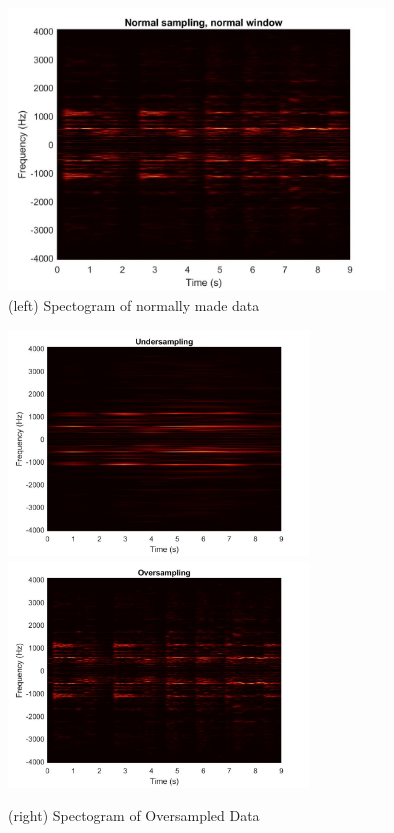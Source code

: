 \documentclass{article}
\begin{document}
\begin{figure}[H]
\begin{center}
\includegraphics[width = 10cm]{normal}
\caption{\label{fig:scaled_diss} (left) Spectogram of normally made data}
\end{center}
\end{figure}


\begin{figure}
\begin{center}
\includegraphics[width = 8cm]{undersampling}
\includegraphics[width = 8cm]{oversampling}
\caption{\label{fig:scaled_diss} (left) Spectogram of Undersampled Data}
\caption{\label{fig:scaled_diss} (right) Spectogram of Oversampled Data}
\end{center}
\end{figure}
\end{document}
